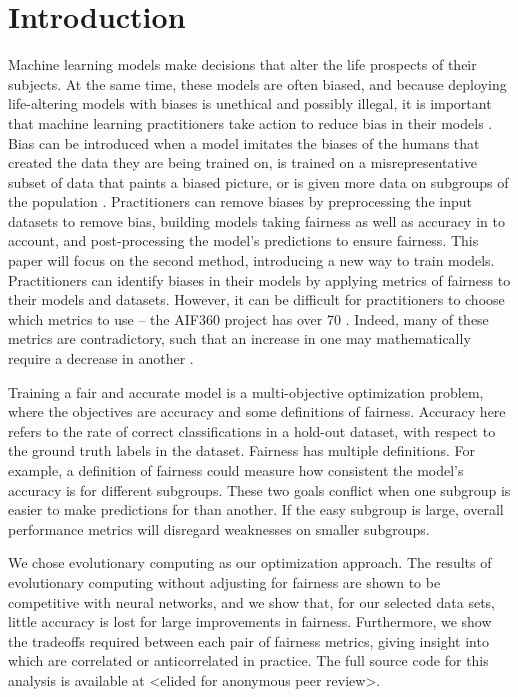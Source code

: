 \documentclass[twoside]{article}
\begin{document}
\section{Introduction}

Machine learning models make decisions that alter the life prospects of their subjects. At the same time, these models are often biased, and because deploying life-altering models with biases is unethical and possibly illegal, it is important that machine learning practitioners take action to reduce bias in their models \citep{Binns:2017}. Bias can be introduced when a model imitates the biases of the humans that created the data they are being trained on, is trained on a misrepresentative subset of data that paints a biased picture, or is given more data on subgroups of the population \citep{Zerbinati:2011}. Practitioners can remove biases by preprocessing the input datasets to remove bias, building models taking fairness as well as accuracy in to account, and post-processing the model’s predictions to ensure fairness. This paper will focus on the second method, introducing a new way to train models. Practitioners can identify biases in their models by applying metrics of fairness to their models and datasets. However, it can be difficult for practitioners to choose which metrics to use – the AIF360 project has over 70 \citep{Bellamy:2018}. Indeed, many of these metrics are contradictory, such that an increase in one may mathematically require a decrease in another \citep{Kleinberg:2016}.

Training a fair and accurate model is a multi-objective optimization problem, where the objectives are accuracy and some definitions of fairness. Accuracy here refers to the rate of correct classifications in a hold-out dataset, with respect to the ground truth labels in the dataset. Fairness has multiple definitions. For example, a definition of fairness could measure how consistent the model’s accuracy is for different subgroups. These two goals conflict when one subgroup is easier to make predictions for than another. If the easy subgroup is large, overall performance metrics will disregard weaknesses on smaller subgroups.

We chose evolutionary computing as our optimization approach. The results of evolutionary computing without adjusting for fairness are shown to be competitive with neural networks, and we show that, for our selected data sets, little accuracy is lost for large improvements in fairness. Furthermore, we show the tradeoffs required between each pair of fairness metrics, giving insight into which are correlated or anticorrelated in practice. The full source code for this analysis is available at <elided for anonymous peer review>.
\end{document}

